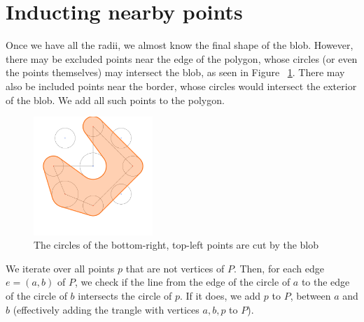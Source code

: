 \documentclass[paper=a4, fontsize=11pt]{scrartcl} %
\numberwithin{equation}{section} %
\numberwithin{figure}{section} %
\numberwithin{table}{section} %
\begin{document}
\section{Inducting nearby points}
Once we have all the radii, we almost know the final shape of the blob. However,
there may be excluded points near the edge of the polygon, whose circles (or
even the points themselves) may intersect the blob, as seen in
Figure ~\ref{fig:whyrefine}. There may also be included points near the border,
whose circles would intersect the exterior of the blob.  We add all such points
to the polygon. \\

\begin{figure}[h]
\includegraphics[width=0.4\textwidth]{whyrefine}
\centering
\caption{The circles of the bottom-right, top-left points are cut by the blob}
\label{fig:whyrefine}
\end{figure}

We iterate over all points $p$ that are not vertices of $P$. Then, for each edge
$e = (a,b)$ of $P$, we check if the line from the edge of the circle of $a$ to
the edge of the circle of $b$ intersects the circle of $p$. If it does, we add
$p$ to $P$, between $a$ and $b$ (effectively adding the trangle with vertices
$a,b,p$ to $P$). \\
\end{document}

